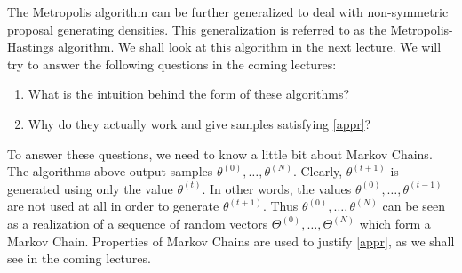 \documentclass{scrartcl}
\begin{document}
The Metropolis algorithm can be further generalized to deal with
non-symmetric proposal generating densities. This generalization is
referred to as the Metropolis-Hastings algorithm. We shall look at
this algorithm in the next lecture. We will try to answer the
following questions in the coming lectures: 
\begin{enumerate}
\item What is the intuition behind the form of these algorithms?
\item Why do they actually work and give samples satisfying
  \eqref{appr}? 
\end{enumerate}

To answer these questions, we need to know a little bit about Markov
Chains. The algorithms above output samples $\theta^{(0)}, \dots,
\theta^{(N)}$. Clearly, $\theta^{(t+1)}$ is generated using only the value
$\theta^{(t)}$. In other words, the values $\theta^{(0)}, \dots,
\theta^{(t-1)}$ are not used at all in order to generate
$\theta^{(t+1)}$. Thus $\theta^{(0)}, \dots, \theta^{(N)}$ can be seen
as a realization of a sequence of random vectors $\Theta^{(0)}, \dots,
\Theta^{(N)}$ which form a Markov Chain. Properties of Markov Chains
are used to justify \eqref{appr}, as we shall see in the coming
lectures. 









  
\end{document}

